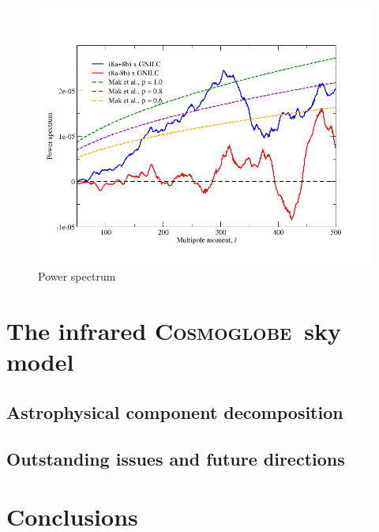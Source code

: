 \documentclass{aa}
\def\Cosmoglobe{\textsc{Cosmoglobe}}
\begin{document}
\begin{figure}
	\centering
	\includegraphics[width=\linewidth]{figs/cross_8.png}
	\caption{Power spectrum}
	\label{fig:CIB_spectrum}
\end{figure}





\section{The infrared \Cosmoglobe\ sky model}
\label{sec:maps}

\subsection{Astrophysical component decomposition}

\subsection{Outstanding issues and future directions}


\clearpage
\section{Conclusions}
\label{sec:conclusions}
\end{document}
